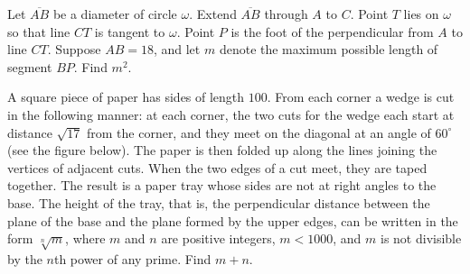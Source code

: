 %	








\begin{question}[name={2008 AIME I, \href{https://artofproblemsolving.com/community/c4p1075202}{Problem 14}}]
	Let $ \overline{AB}$ be a diameter of circle $ \omega$. Extend $ \overline{AB}$ through $ A$ to $ C$. Point $ T$ lies on $ \omega$ so that line $ CT$ is tangent to $ \omega$. Point $ P$ is the foot of the perpendicular from $ A$ to line $ CT$. Suppose $ AB = 18$, and let $ m$ denote the maximum possible length of segment $ BP$. Find $m^{2}$.
\end{question}


%	













\begin{question}[name={2008 AIME I, \href{https://artofproblemsolving.com/community/c4p1075230}{Problem 15}}]
	A square piece of paper has sides of length $ 100$. From each corner a wedge is cut in the following manner: at each corner, the two cuts for the wedge each start at distance $ \sqrt {17}$ from the corner, and they meet on the diagonal at an angle of $ 60^\circ$ (see the figure below). The paper is then folded up along the lines joining the vertices of adjacent cuts. When the two edges of a cut meet, they are taped together. The result is a paper tray whose sides are not at right angles to the base. The height of the tray, that is, the perpendicular distance between the plane of the base and the plane formed by the upper edges, can be written in the form $ \sqrt [n]{m}$, where $ m$ and $ n$ are positive integers, $ m < 1000$, and $ m$ is not divisible by the $ n$th power of any prime. Find $ m + n$.
\end{question}


%	




















